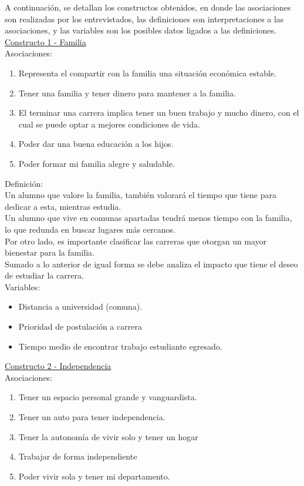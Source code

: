 A continuación, se detallan los constructos obtenidos, en donde las asociaciones son realizadas por los entrevistados, las definiciones son interpretaciones a las asociaciones, y las variables son los posibles datos ligados a las definiciones.\\    

\underline {Constructo 1 - Familia} \\
Asociaciones:
\begin{enumerate}
	\item Representa el compartir con la familia una situación económica estable.
	\item Tener una familia y tener dinero para mantener a la familia.
	\item El terminar una carrera implica tener un buen trabajo y mucho dinero, con el cual se puede optar a mejores condiciones de vida.
	\item Poder dar una buena educación a los hijos.
	\item Poder formar mi familia alegre y saludable.	
\end{enumerate}

Definición:\\
Un alumno que valore la familia, también valorará el tiempo que tiene para dedicar a esta, mientras estudia.\\
Un alumno que vive en comunas apartadas tendrá menos tiempo con la familia, lo que redunda en buscar lugares más cercanos.\\
Por otro lado, es importante clasificar las carreras que otorgan un mayor bienestar para la familia.\\
Sumado a lo anterior de igual forma se debe analiza el impacto que tiene el deseo de estudiar la carrera.\\


Variables:
\begin{itemize}
	\item Distancia a universidad (comuna).
	\item Prioridad de postulación a carrera
	\item Tiempo medio de encontrar trabajo estudiante egresado.
\end{itemize}


\underline {Constructo 2 - Independencia}\\ 
Asociaciones:
\begin{enumerate}
	\item Tener un espacio personal grande y vanguardista.
	\item Tener un auto para tener independencia.
	\item Tener la autonomía de vivir solo y tener un hogar
	\item Trabajar de forma independiente
	\item Poder vivir sola y tener mi departamento.	
\end{enumerate}


